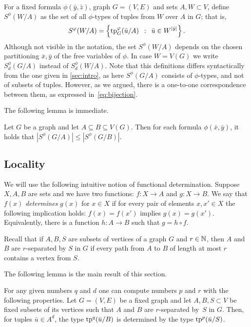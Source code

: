 For a fixed formula $\phi(\bar y,\bar z)$,  graph $G=(V,E)$ and sets $A,W\subset V$, define
 $S^\phi(W/A)$ as the set of all $\phi$-types of tuples from $W$ over $A$ in $G$; that is, 
\begin{equation*}
S^\varphi(W/A)=\left\{\mathrm{tp}^\varphi_G(\bar u/A) \,~:~\, \bar u\in W^{|\bar y|} \right\}.
\end{equation*}
Although not visible in the notation, the set $S^\phi(W/A)$ depends on the chosen partitioning $\bar x,\bar y$ of the free variables of $\phi$.
In case $W=V(G)$ we write $S^{\phi}_d(G/A)$ instead of $S^{\phi}_d(W/A)$.
Note that this definitions differs syntactically from the one given in \cref{sec:intro}, as here $S^{\phi}(G/A)$ consists of $\phi$-types, and not of subsets of tuples.
However, as we argued, there is a one-to-one correspondence between them, as expressed in~\eqref{eq:bijection}.

The following lemma is immediate.
\begin{lemma}\label{lem:types-over-B}
Let $G$ be a graph and let $A\subseteq B\subseteq V(G)$. Then for each formula $\phi(\bar x,\bar y)$, it holds that
$|S^\phi(G/A)|\leq |S^\phi(G/B)|$. 
\end{lemma}

\subsection{Locality}
We will use the following intuitive notion of functional determination.
Suppose $X,A,B$ are sets and we have two functions: $f\colon X\to A$ and $g\colon X\to B$.
We say that $f(x)$ {\em{determines}} $g(x)$ for $x\in X$ if for every pair of elements $x,x'\in X$ the following implication holds: $f(x)=f(x')$ implies $g(x)=g(x')$.
Equivalently, there is a function $h\colon A\to B$ such that $g=h\circ f$.

Recall that if $A,B,S$ are subsets of vertices of a graph $G$ and $r\in\mathbb{N}$,
then $A$ and $B$ are $r$-separated by $S$ in $G$
if every path from $A$ to $B$ of length at most $r$ contains a vertex from $S$.

\medskip
The following lemma is the main result of this section. 

\begin{lemma}\label{lem:types}
For any given numbers $q$ and $d$
one can compute numbers $p$ and $r$ with the following properties.
Let $G=(V,E)$ be a fixed graph and let $A,B,S\subset V$ be fixed subsets of its vertices
such that $A$ and $B$ are $r$-separated by~$S$ in $G$.
Then, for tuples $\bar u\in A^{d}$, the type $\mathrm{tp}^q(\bar u/B)$ is determined by the type $\mathrm{tp}^{p}(\bar u/S)$.
\end{lemma}

